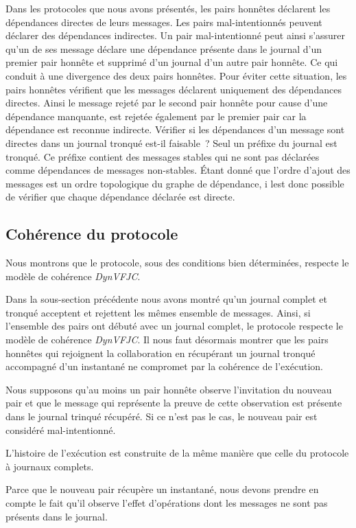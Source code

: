 Dans les protocoles que nous avons présentés, les pairs honnêtes déclarent les dépendances directes de leurs messages.
Les pairs mal-intentionnés peuvent déclarer des dépendances indirectes.
Un pair mal-intentionné peut ainsi s'assurer qu'un de ses message déclare une dépendance présente dans le journal d'un premier pair honnête et supprimé d'un journal d'un autre pair honnête.
Ce qui conduit à une divergence des deux pairs honnêtes.
Pour éviter cette situation, les pairs honnêtes vérifient que les messages déclarent uniquement des dépendances directes.
Ainsi le message rejeté par le second pair honnête pour cause d'une dépendance manquante, est rejetée également par le premier pair car la dépendance est reconnue indirecte.
Vérifier si les dépendances d'un message sont directes dans un journal tronqué est-il faisable~?
Seul un préfixe du journal est tronqué.
Ce préfixe contient des messages stables qui ne sont pas déclarées comme dépendances de messages non-stables.
Étant donné que l'ordre d'ajout des messages est un ordre topologique du graphe de dépendance, i lest donc possible de vérifier que chaque dépendance déclarée est directe.

\subsection{Cohérence du protocole}

Nous montrons que le protocole, sous des conditions bien déterminées, respecte le modèle de cohérence \emph{DynVFJC}.

Dans la sous-section précédente nous avons montré qu'un journal complet et tronqué acceptent et rejettent les mêmes ensemble de messages.
Ainsi, si l'ensemble des pairs ont débuté avec un journal complet, le protocole respecte le modèle de cohérence \emph{DynVFJC}.
Il nous faut désormais montrer que les pairs honnêtes qui rejoignent la collaboration en récupérant un journal tronqué accompagné d'un instantané ne compromet par la cohérence de l'exécution.

Nous supposons qu'au moins un pair honnête observe l'invitation du nouveau pair et que le message qui représente la preuve de cette observation est présente dans le journal trinqué récupéré.
Si ce n'est pas le cas, le nouveau pair est considéré mal-intentionné.

L'histoire de l'exécution est construite de la même manière que celle du protocole à journaux complets.

Parce que le nouveau pair récupère un instantané, nous devons prendre en compte le fait qu'il observe l'effet d'opérations dont les messages ne sont pas présents dans le journal.

